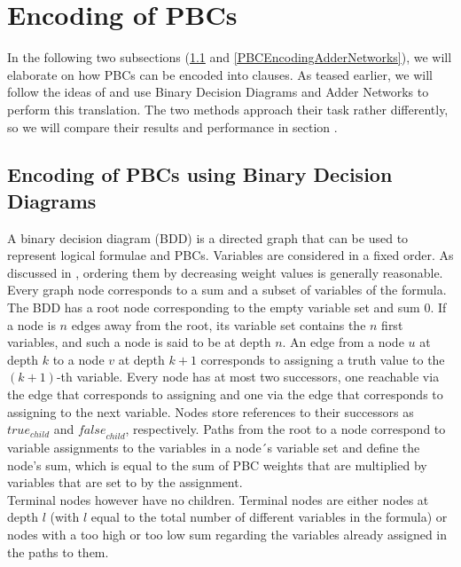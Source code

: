 \section{Encoding of PBCs}
In the following two subsections (\ref{PBCEncodingBDD} and \ref{PBCEncodingAdderNetworks}), we will elaborate on how PBCs can be encoded into clauses. As teased earlier, we will follow the ideas of \cite{Een2006TranslatingPC} and use Binary Decision Diagrams and Adder Networks to perform this translation. The two methods approach their task rather differently, so we will compare their results and performance in section .

\subsection{Encoding of PBCs using Binary Decision Diagrams}\label{PBCEncodingBDD}
A binary decision diagram (BDD) is a directed graph that can be used to represent logical formulae and PBCs. 
Variables are considered in a fixed order. As discussed in \cite{Een2006TranslatingPC}, ordering them by decreasing weight values is generally reasonable. Every graph node corresponds to a sum and a subset of variables of the formula. The BDD has a root node corresponding to the empty variable set and sum 0. If a node is $n$ edges away from the root, its variable set contains the $n$ first variables, and such a node is said to be at depth $n$. An edge from a node $u$ at depth $k$ to a node $v$ at depth $k+1$ corresponds to assigning a truth value to the $(k+1)$-th variable. Every node has at most two successors, one reachable via the edge that corresponds to assigning \true{} and one via the edge that corresponds to assigning \false{} to the next variable. Nodes store references to their successors as \emph{$\textit{true}_{child}$} and \emph{$\textit{false}_{child}$}, respectively. Paths from the root to a node correspond to variable assignments to the variables in a node´s variable set and define the node's sum, which is equal to the sum of PBC weights that are multiplied by variables that are set to \true{} by the assignment.\\

Terminal nodes however have no children. Terminal nodes are either nodes at depth $l$ (with $l$ equal to the total number of different variables in the formula) or nodes with a too high or too low sum regarding the variables already assigned in the paths to them.\\

